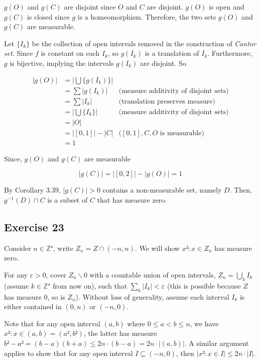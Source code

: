 \documentclass{article}
\begin{document}
$g(O)$ and $g(C)$ are disjoint since $O$ and $C$ are disjoint. $g(O)$ is open and $g(C)$ is closed since $g$ is a homeomorphism. Therefore, the two sets $g(O)$ and $g(C)$ are measurable.

Let $\{ I_k\}$ be the collection of open intervals removed in the construction of \emph{Cantor set}. Since $f$ is constant on each $I_k$, so $g(I_k)$ is a translation of $I_k$. Furthermore, $g$ is bijective, implying the intervals $g(I_k)$ are disjoint. So

\begin{align*}
    |g(O)|  &= \left|\bigcup \{ g(I_k)\}\right| \\
            &= \sum |g(I_k)| &\text{(measure additivity of disjoint sets)}\\
            &= \sum |I_k| &\text{(translation preserves measure)}\\
            &= \left|\bigcup \{ I_k\}\right| &\text{(measure additivity of disjoint sets)}\\
            &= |O| \\
            &= |[0, 1]| - |C|   &\text{($[0, 1], C, O$ is measurable)}\\
            &= 1
\end{align*}

Since, $g(O)$ and $g(C)$ are measurable

$$
    |g(C)| = |[0, 2]| - |g(O)| = 1
$$

By Corollary 3.39, $|g(C)| > 0$ contains a non-measurable set, namely $D$. Then, $g^{-1}(D) \cap C$ is a subset of $C$ that has measure zero.

\subsection{Exercise 23}%

\typstmathinputenable{\$}
Consider $n ∈ ℤ⁺$, write $Z_n = Z ∩ (-n, n)$. We will show ${x²: x ∈ Z_n}$ has measure zero.

For any $ε>0$, cover $Z_n ∖ {0}$ with a countable union of open intervals, $Z_n = ⋃_k I_k$ (assume $k ∈ ℤ⁺$ from now on), such that $∑_k |I_k| < ε$ (this is possible because $Z$ has measure 0, so is $Z_n$). Without loss of generality, assume each interval $I_k$ is either contained in $(0,n)$ or $(-n, 0)$.

Note that for any open interval $(a, b)$ where $0 ≤ a < b ≤ n$, we have ${x²: x ∈(a, b)}= (a², b²)$, the latter has measure $b²-a² = (b-a)(b+a) ≤ 2n ⋅ (b-a) = 2n ⋅ |(a, b)|$. A similar argument applies to show that for any open interval $I ⊆ (-n, 0)$, then $|{x²: x ∈ I}|≤ 2n ⋅ |I|$.
\end{document}
